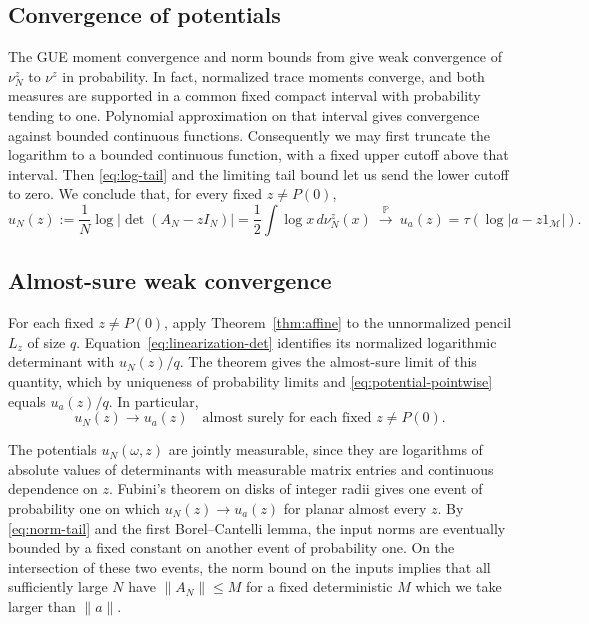 \subsection{Convergence of potentials}\label{subsec:potentials}

The GUE moment convergence and norm bounds from \cite[pp.~1--2 of arXiv v1]{CGP22} give weak convergence of $\nu_N^z$ to $\nu^z$ in probability.
In fact, normalized trace moments converge, and both measures are supported in a common fixed compact interval with probability tending to one.
Polynomial approximation on that interval gives convergence against bounded continuous functions.
Consequently we may first truncate the logarithm to a bounded continuous function, with a fixed upper cutoff above that interval.
Then \eqref{eq:log-tail} and the limiting tail bound let us send the lower cutoff to zero.
We conclude that, for every fixed $z\ne P(0)$,
\begin{equation}\label{eq:potential-pointwise}
 u_N(z):=\frac1N\log|\det(A_N-zI_N)|
         =\frac12\int\log x\,d\nu_N^z(x)
 \ \xrightarrow{\mathbb P}\
 u_a(z)=\tau(\log|a-z1_{\mathcal M}|).
\end{equation}

\subsection{Almost-sure weak convergence}\label{subsec:brown-as}

For each fixed $z\ne P(0)$, apply Theorem~\ref{thm:affine} to the unnormalized pencil $L_z$ of size $q$.
Equation~\eqref{eq:linearization-det} identifies its normalized logarithmic determinant with $u_N(z)/q$.
The theorem gives the almost-sure limit of this quantity, which by uniqueness of probability limits and \eqref{eq:potential-pointwise} equals $u_a(z)/q$.
In particular,
\[
 u_N(z)\longrightarrow u_a(z)\quad\text{almost surely for each fixed }z\ne P(0).
\]

The potentials $u_N(\omega,z)$ are jointly measurable, since they are logarithms of absolute values of determinants with measurable matrix entries and continuous dependence on $z$.
Fubini's theorem on disks of integer radii gives one event of probability one on which $u_N(z)\to u_a(z)$ for planar almost every $z$.
By \eqref{eq:norm-tail} and the first Borel--Cantelli lemma, the input norms are eventually bounded by a fixed constant on another event of probability one.
On the intersection of these two events, the norm bound on the inputs implies that all sufficiently large $N$ have $\|A_N\|\le M$ for a fixed deterministic $M$ which we take larger than $\|a\|$.

